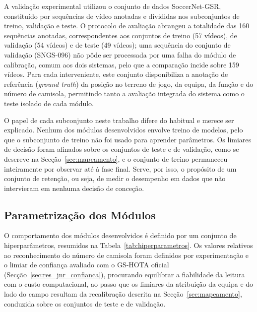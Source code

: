 A validação experimental utilizou o conjunto de dados SoccerNet-GSR, constituído por
sequências de vídeo anotadas e divididas nos subconjuntos de treino, validação e teste.
O protocolo de avaliação abrangeu a totalidade das 160 sequências anotadas,
correspondentes aos conjuntos de treino (57 vídeos), de validação (54 vídeos) e de teste
(49 vídeos); uma sequência do conjunto de validação (SNGS-096) não pôde ser processada por
uma falha do módulo de calibração, comum aos dois sistemas, pelo que a comparação incide
sobre 159 vídeos. Para cada interveniente, este conjunto disponibiliza a anotação de
referência (\emph{ground truth}) da posição no terreno de jogo, da equipa, da função e do
número de camisola, permitindo tanto a avaliação integrada do sistema como o teste
isolado de cada módulo.

O papel de cada subconjunto neste trabalho difere do habitual e merece ser explicado. Nenhum dos
módulos desenvolvidos envolve treino de modelos, pelo que o subconjunto de treino não foi usado
para aprender parâmetros. Os limiares de decisão foram afinados sobre os conjuntos de teste e de
validação, como se descreve na Secção~\ref{sec:mapeamento}, e o conjunto de treino permaneceu
inteiramente por observar até à fase final. Serve, por isso, o propósito de um conjunto de
retenção, ou seja, de medir o desempenho em dados que não intervieram em nenhuma decisão de
conceção.

\subsection{Parametrização dos Módulos}

O comportamento dos módulos desenvolvidos é definido por um conjunto de hiperparâmetros, resumidos na
Tabela~\ref{tab:hiperparametros}. Os valores relativos ao reconhecimento do número de camisola foram
definidos por experimentação e o limiar de confiança avaliado com o GS-HOTA oficial (Secção~\ref{sec:res_jnr_confianca}), procurando equilibrar a fiabilidade da leitura com o custo
computacional, ao passo que os limiares da atribuição da equipa e do lado do campo resultam da
recalibração descrita na Secção~\ref{sec:mapeamento}, conduzida sobre os conjuntos de teste e de
validação.


